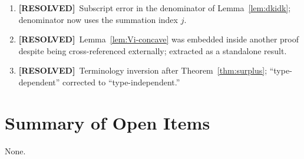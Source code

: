 \documentclass{class}
\newcommand{\ok}{\textcolor{ok}{\textbf{[RESOLVED]}}}
\begin{document}
\begin{enumerate}[leftmargin=1.5cm]
\item \ok\ Subscript error in the denominator of Lemma~\ref{lem:dkidk}; denominator now uses the summation index $j$.

\item \ok\ Lemma~\ref{lem:Vi-concave} was embedded inside another proof despite being cross-referenced externally; extracted as a standalone result.

\item \ok\ Terminology inversion after Theorem~\ref{thm:surplus}; ``type-dependent'' corrected to ``type-independent.''

\end{enumerate}

\section*{Summary of Open Items}

None.
\end{document}
